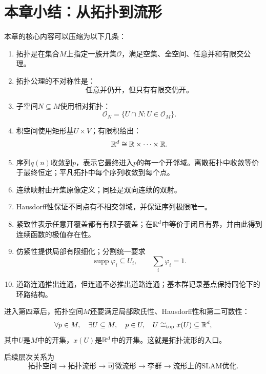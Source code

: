
\section{本章小结：从拓扑到流形}

本章的核心内容可以压缩为以下几条：

\begin{enumerate}
    \item 拓扑是在集合$M$上指定一族开集$\mathcal O$，满足空集、全空间、任意并和有限交公理。
    \item 拓扑公理的不对称性是：
    \[
        \text{任意并仍开，但只有有限交仍开。}
    \]
    \item 子空间$N\subseteq M$使用相对拓扑：
    \[
        \mathcal O_N=\{U\cap N:U\in\mathcal O_M\}.
    \]
    \item 积空间使用矩形基$U\times V$；有限积给出：
    \[
        \mathbb{R}^d\cong\mathbb{R}\times\cdots\times\mathbb{R}.
    \]
    \item 序列$q(n)$收敛到$p$，表示它最终进入$p$的每一个开邻域。离散拓扑中收敛等价于最终恒定；平凡拓扑中每个序列收敛到每个点。
    \item 连续映射由开集原像定义；同胚是双向连续的双射。
    \item Hausdorff性保证不同点有不相交邻域，并保证序列极限唯一。
    \item 紧致性表示任意开覆盖都有有限子覆盖；在$\mathbb{R}^d$中等价于闭且有界，并由此得到连续函数的极值存在性。
    \item 仿紧性提供局部有限细化；分割统一要求
    \[
        \operatorname{supp}\varphi_i\subseteq U_i,
        \qquad
        \sum_i\varphi_i=1.
    \]
    \item 道路连通推出连通，但连通不必推出道路连通；基本群记录基点保持同伦下的环路结构。
\end{enumerate}

进入第四章后，拓扑空间$M$还要满足局部欧氏性、Hausdorff性和第二可数性：
\[
    \forall p\in M,\quad
    \exists U\subseteq M,\quad
    p\in U,\quad
    U\cong_{\mathrm{top}}x(U)\subseteq\mathbb{R}^d,
\]
其中$U$是$M$中的开集，$x(U)$是$\mathbb{R}^d$中的开集。这就是拓扑流形的入口。

后续层次关系为
\[
    \text{拓扑空间}
    \longrightarrow
    \text{拓扑流形}
    \longrightarrow
    \text{可微流形}
    \longrightarrow
    \text{李群}
    \longrightarrow
    \text{流形上的SLAM优化}.
\]
